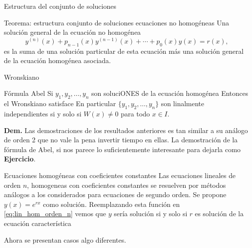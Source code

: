 \documentclass[hyperref={colorlinks=true}]{beamer}
\begin{document}
\begin{frame}{Estructura del conjunto de soluciones}
\begin{block}{Teorema: estructura conjunto de soluciones ecuaciones no homogéneas}
Una solución general de la ecuación no homogénea  
\[y^{(n)}(x)+p_{n-1}(x)y^{(n-1)}(x)+\cdots+p_0(x)y(x)=r(x),\]
es la suma de una solución particular de esta ecuación más una solución general de la ecuación homogénea asociada.
\end{block}

\end{frame}




\begin{frame}{Wronskiano}
\begin{block}{Fórmula Abel}
Si $y_1,y_2,\ldots,y_n$ son soluciONES de la ecuación  homogénea  
Entonces el Wronskiano satisface
En particular  $\{y_1,y_2,\ldots,y_n\}$ son linalmente independientes si y solo si $W(x)\neq 0$ para todo $x\in I$.
\end{block}

\textbf{Dem.} Las demostraciones de los resultados anteriores es tan similar a su análogo de orden 2 que no vale la pena invertir tiempo en ellas. La demostración de la fórmula de Abel, si nos parece lo suficientemente interesante para dejarla como \textbf{Ejercicio}.
\end{frame}


\begin{frame}{Ecuaciones homogéneas con coeficientes constantes}
Las ecuaciones lineales de orden $n$, homogeneas con coeficientes constantes  se resuelven por métodos análogos a los considerados para ecuaciones de segundo orden. Se propone $y(x)=e^{rx}$ como solución. Reemplazando esta función
en \eqref{eq:lin_hom_orden_n} vemos que $y$ sería solución si y solo si $r$ es solución de la ecuación característica
 
Ahora se presentan casos algo diferentes.


\end{frame}
\end{document}
